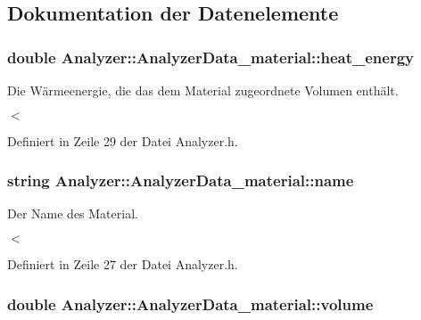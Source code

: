 \subsection{Dokumentation der Datenelemente}
\hypertarget{structAnalyzer_1_1AnalyzerData__material_a94efc7f38f7f59c97a48a0155f9c4719}{
\subsubsection[{heat\-\_\-energy}]{\setlength{\rightskip}{0pt plus 5cm}double Analyzer\-::\-Analyzer\-Data\-\_\-material\-::heat\-\_\-energy}}\label{structAnalyzer_1_1AnalyzerData__material_a94efc7f38f7f59c97a48a0155f9c4719}


Die Wärmeenergie, die das dem Material zugeordnete Volumen enthält. 

$<$ 

Definiert in Zeile 29 der Datei Analyzer.\-h.

\hypertarget{structAnalyzer_1_1AnalyzerData__material_a0a6b01fc900ce677ae8403d3a85b829b}{
\subsubsection[{name}]{\setlength{\rightskip}{0pt plus 5cm}string Analyzer\-::\-Analyzer\-Data\-\_\-material\-::name}}\label{structAnalyzer_1_1AnalyzerData__material_a0a6b01fc900ce677ae8403d3a85b829b}


Der Name des Material. 

$<$ 

Definiert in Zeile 27 der Datei Analyzer.\-h.

\hypertarget{structAnalyzer_1_1AnalyzerData__material_a20017730ff899b65f91aa30caaf35dd6}{
\subsubsection[{volume}]{\setlength{\rightskip}{0pt plus 5cm}double Analyzer\-::\-Analyzer\-Data\-\_\-material\-::volume}}\label{structAnalyzer_1_1AnalyzerData__material_a20017730ff899b65f91aa30caaf35dd6}


